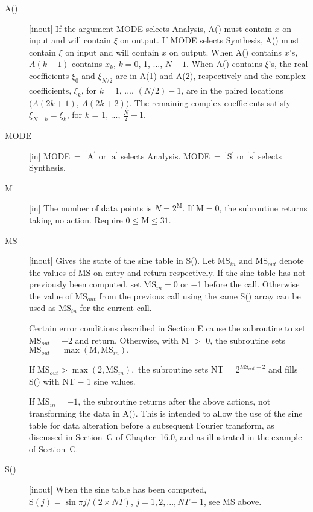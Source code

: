 \documentclass[twoside]{MATH77}
\begin{document}
\begin{description}
\item[A()]  [inout] If the argument MODE selects Analysis, A() must contain $%
x$ on input and will contain $\xi $ on output. If MODE selects Synthesis,
A() must contain $\xi $ on input and will contain $x$ on output. When A()
contains $x$'s, $A(k+1)$ contains $x_k$, $k=0$, 1, ..., $N-1$. When
A() contains $\xi $'s, the real coefficients $\xi _0$ and $\xi
_{N/2}$ are in A(1) and A(2), respectively and the complex coefficients, $%
\xi _k$, for $k=1$, ..., $(N/2)-1$, are in the paired locations $(A(2k+1)$, $%
A(2k+2))$. The remaining complex coefficients satisfy $\xi _{N-k} =
\overline{\xi}_k$, for $k$ = 1, ..., $\frac N2-1$.

\item[MODE]  [in] MODE\ =\ $^{\prime }\text{A}^{\prime }$
or $^{\prime }\text{a}^{\prime }$ selects Analysis.
MODE\ =\ $^{\prime }\text{S}^{\prime }$ or $^{\prime }\text{s}^{\prime }$
selects Synthesis.

\item[M]  [in] The number of data points is $N=2^{\text{M}}$. If $\text{M}=0$,
the subroutine returns taking no action. Require $0\leq \text{M}\leq 31.$

\item[MS]  [inout] Gives the state of the sine table in S().  Let
$\text{MS}_{in}\text{ and MS}_{out}$ denote the values of MS on entry
and return respectively. If the sine table has not previously been
computed, set $\text{MS}_{in} = 0$ or $-$1 before the call. Otherwise
the value of $\text{MS}_{out}$ from the previous call using the same
S() array can be used as $\text{MS}_{in}$ for the current call.

Certain error conditions described in Section E cause the subroutine
to set $\text{MS}_{out} = -2$ and return.  Otherwise, with M $>$ 0, the
subroutine sets $\text{MS}_{out} = \max (\text{M}, \text{MS}_{in}).$

If $\text{MS}_{out} > \max (2, \text{MS}_{in}),$ the subroutine sets
NT = $2^{\text{MS}_{out}-2}$ and fills S() with NT $-$ 1 sine values.

If $\text{MS}_{in}=-1$, the subroutine returns after the above
actions, not transforming the data in A().  This is intended to allow
the use of the sine table for data alteration before a subsequent Fourier
transform, as discussed in Section~G of Chapter~16.0, and as
illustrated in the example of Section~C.

\item[S()]  [inout] When the sine table has been computed, $\text{S}(j)=
\sin \pi j/(2\times NT)$, $j=1,2,...,NT-1$, see MS above.
\end{description}
\end{document}
